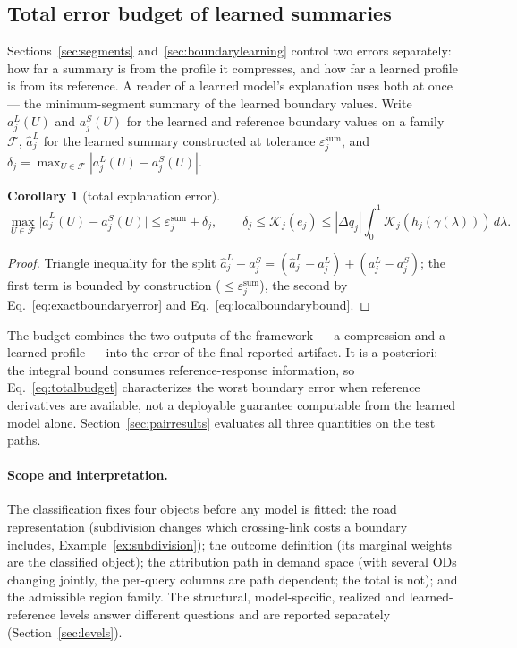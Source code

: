 \documentclass[a4paper,fleqn]{cas-sc}
\newtheorem{corollary}[theorem]{Corollary}
\begin{document}
\subsection{Total error budget of learned summaries}\label{sec:totalbudget}
Sections~\ref{sec:segments} and~\ref{sec:boundarylearning} control two
errors separately: how far a summary is from the profile it compresses,
and how far a learned profile is from its reference. A reader of a
learned model's explanation uses both at once --- the minimum-segment
summary of the learned boundary values. Write $a_j^L(U)$ and $a_j^S(U)$ for
the learned and reference boundary values on a family $\mathcal F$,
$\hat a_j^L$ for the learned summary constructed at tolerance
$\varepsilon^{\mathrm{sum}}_j$, and
$\delta_j=\max_{U\in\mathcal F}|a_j^L(U)-a_j^S(U)|$.
\begin{corollary}[total explanation error]\label{cor:totalbudget}
\begin{equation}
\max_{U\in\mathcal F}\bigl|\hat a_j^L(U)-a_j^S(U)\bigr|
\le\varepsilon^{\mathrm{sum}}_j+\delta_j,
\qquad
\delta_j\le\mathcal K_j(e_j)\le|\Delta q_j|\int_0^1\mathcal K_j(h_j(\gamma(\lambda)))\,d\lambda.
\label{eq:totalbudget}
\end{equation}
\end{corollary}
\begin{proof}
Triangle inequality for the split
$\hat a_j^L-a_j^S=(\hat a_j^L-a_j^L)+(a_j^L-a_j^S)$; the first term is
bounded by construction ($\le\varepsilon^{\mathrm{sum}}_j$), the second by
Eq.~\eqref{eq:exactboundaryerror} and Eq.~\eqref{eq:localboundarybound}.
\end{proof}
The budget combines the two outputs of the framework --- a
compression and a learned profile --- into the error of the final
reported artifact. It is a posteriori: the integral bound consumes
reference-response information, so Eq.~\eqref{eq:totalbudget}
characterizes the worst boundary error when reference derivatives are
available, not a deployable guarantee computable from the learned model
alone. Section~\ref{sec:pairresults} evaluates all three quantities on
the test paths.

\paragraph{Scope and interpretation.}\label{sec:noninheritance}
The classification fixes four objects before any model is fitted: the
road representation (subdivision changes which crossing-link costs a
boundary includes, Example~\ref{ex:subdivision}); the outcome
definition (its marginal weights are the classified object); the
attribution path in demand space (with several ODs changing jointly,
the per-query columns are path dependent; the total is not); and the
admissible region family. The structural, model-specific, realized and
learned-reference levels answer different questions and are reported
separately (Section~\ref{sec:levels}).
\end{document}
